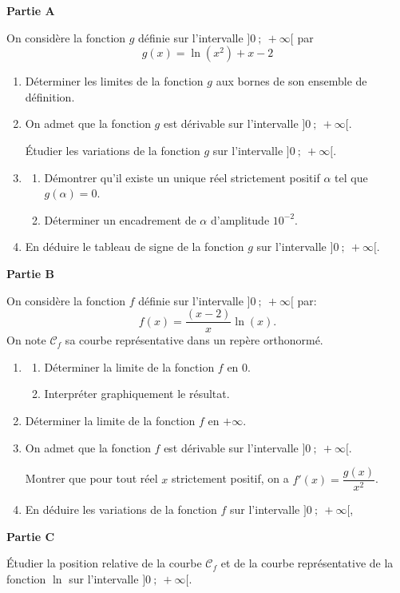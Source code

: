 \medskip

\textbf{Partie A}

\medskip

On considère la fonction $g$ définie sur l'intervalle $]0~;~+\infty[$ par
\[g(x) = \ln \left(x^2\right) + x - 2\]
\begin{enumerate}
\item  Déterminer les limites de la fonction $g$ aux bornes de son ensemble de définition.
\item  On admet que la fonction $g$ est dérivable sur l'intervalle $]0~;~+\infty[$.

Étudier les variations de la fonction $g$ sur l'intervalle $]0~;~+\infty[$.
\item \begin{enumerate}
\item  Démontrer qu'il existe un unique réel strictement positif $\alpha$  tel que $g(\alpha) = 0$.
\item Déterminer un encadrement de $\alpha$ d'amplitude $10^{-2}$.
\end{enumerate}
\item En déduire le tableau de signe de la fonction $g$ sur l'intervalle $]0~;~+\infty[$.
\end{enumerate}

\medskip

\textbf{Partie B}

\medskip

On considère la fonction $f$ définie sur l'intervalle $]0~;~+\infty[$ par:
\[f(x) = \dfrac{(x-2)}{x}\ln(x).\]
On note $\mathcal{C}_f$ sa courbe représentative dans un repère orthonormé.
\begin{enumerate}
\item \begin{enumerate}
\item Déterminer la limite de la fonction $f$ en 0.
\item Interpréter graphiquement le résultat.
\end{enumerate}
\item Déterminer la limite de la fonction $f$ en $+\infty$.
\item On admet que la fonction $f$ est dérivable sur l'intervalle $]0~;~+\infty[$.

Montrer que pour tout réel $x$ strictement positif, on a $f'(x)=\dfrac{g(x)}{x^2}$.

\item En déduire les variations de la fonction $f$ sur l'intervalle $]0~;~+\infty[$,
\end{enumerate}
\medskip
\textbf{Partie C}
\medskip

Étudier la position relative de la courbe $\mathcal{C}_f$ et de la courbe représentative de la fonction $\ln$ sur l'intervalle $]0~;~+\infty[$.

\bigskip

